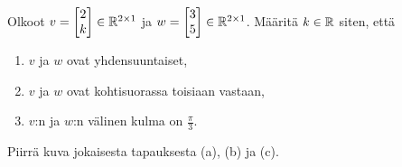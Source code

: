 \documentclass[11pt,a4paper]{amsart}
\begin{document}
\begin{exercise}
  Olkoot \(v=
    \begin{bmatrix}2 \\ k
  \end{bmatrix}\in\mathbb{R}^{2\times 1}\)
  ja \(w=
    \begin{bmatrix}3 \\ 5
  \end{bmatrix}\in\mathbb{R}^{2\times 1}\).
  Määritä \(k\in\mathbb{R}\) siten, että
  \begin{enumerate}[label=(\alph*), leftmargin=*]
    \item \(v\) ja \(w\) ovat yhdensuuntaiset,
    \item \(v\) ja \(w\) ovat kohtisuorassa toisiaan vastaan,
    \item \(v\):n ja \(w\):n välinen kulma on \(\frac{\pi}{3}\).
  \end{enumerate}
  Piirrä kuva jokaisesta tapauksesta (a), (b) ja (c).
\end{exercise}
\end{document}
